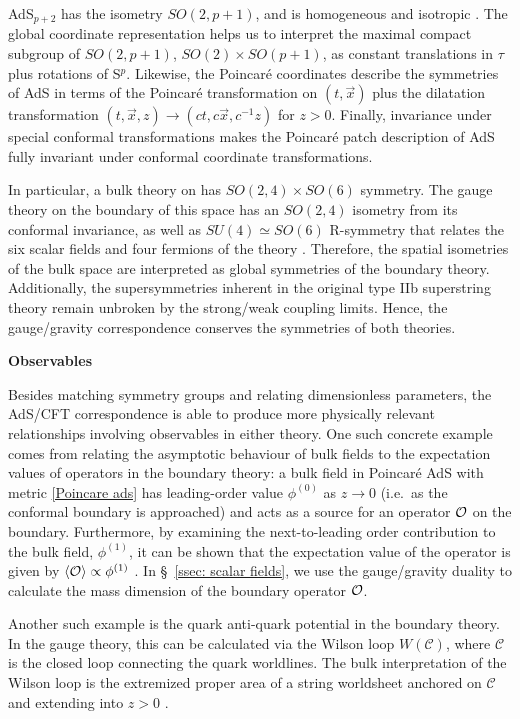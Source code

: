 \documentclass[../PhD.tex]{subfiles}
\begin{document}
AdS$_{p+2}$ has the isometry $SO(2,p+1)$, and is homogeneous and isotropic \cite{hep-th/9905111}. The global coordinate representation helps us to interpret the maximal compact subgroup of $SO(2, p+1)$, $SO(2)\times SO(p+1)$, as constant translations in $\tau$ plus rotations of S$^p$. Likewise, the Poincar\'e coordinates describe the symmetries of AdS in terms of the Poincar\'e transformation on $(t, \vec x)$ plus the dilatation transformation {$(t, \vec x, z) \to (ct, c \vec x, c^{-1}z)$} for $z >0$. Finally, invariance under special conformal transformations makes the Poincar\'e patch description of AdS fully invariant under conformal coordinate transformations.

In particular, a bulk theory on \ads has $SO(2,4)\times SO(6)$ symmetry. The gauge theory on the boundary of this space has an $SO(2,4)$ isometry from its conformal invariance, as well as $SU(4) \simeq SO(6)$ R-symmetry that relates the six scalar fields and four fermions of the theory \cite{hep-th/9711200}. Therefore, the spatial isometries of the bulk space are interpreted as global symmetries of the boundary theory. Additionally, the supersymmetries inherent in the original type IIb superstring theory remain unbroken by the strong/weak coupling limits. Hence, the gauge/gravity correspondence conserves the symmetries of both theories.

{\bf Observables}

Besides matching symmetry groups and relating dimensionless parameters, the AdS/CFT correspondence is able to produce more physically relevant relationships involving observables in either theory. One such concrete example comes from relating the asymptotic behaviour of bulk fields to the expectation values of operators in the boundary theory: a bulk field in Poincar\'e AdS with metric \eqref{Poincare ads} has leading-order value $\phi^{(0)}$ as $z \to 0$ (i.e.~as the conformal boundary is approached) and acts as a source for an operator $\mathcal O$ on the boundary. Furthermore, by examining the next-to-leading order contribution to the bulk field, $\phi^{(1)}$, it can be shown that the expectation value of the operator is given by $\langle \mathcal O \rangle \propto \phi^{(1)}$ \cite{hep-th/9905104}. In \S~\!\ref{ssec: scalar fields}, we use the gauge/gravity duality to calculate the mass dimension of the boundary operator $\mathcal O$.

Another such example is the quark anti-quark potential in the boundary theory. In the gauge theory, this can be calculated via the Wilson loop $W(\mathcal C)$, where $\mathcal C$ is the closed loop connecting the quark worldlines. The bulk interpretation of the Wilson loop is the extremized proper area of a string worldsheet anchored on $\mathcal C$ and extending into $z > 0$ \cite{hep-th/9803002}. 
\end{document}
